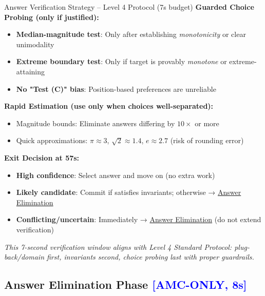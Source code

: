 \documentclass{article}
\begin{document}
\begin{classifybox}{Answer Verification Strategy -- Level 4 Protocol (7s budget)}
\textbf{Guarded Choice Probing (only if justified):}
\begin{itemize}[nosep]
\item \textbf{Median-magnitude test}: Only after establishing \emph{monotonicity} or clear unimodality
\item \textbf{Extreme boundary test}: Only if target is provably \emph{monotone} or extreme-attaining
\item \textbf{No "Test (C)" bias}: Position-based preferences are unreliable
\end{itemize}

\textbf{Rapid Estimation (use only when choices well-separated):}
\begin{itemize}[nosep]
\item Magnitude bounds: Eliminate answers differing by $10\times$ or more  
\item Quick approximations: $\pi \approx 3$, $\sqrt{2} \approx 1.4$, $e \approx 2.7$ (risk of rounding error)
\end{itemize}


\textbf{Exit Decision at 57s:}
\begin{itemize}[nosep]
\item \textbf{High confidence}: Select answer and move on (no extra work)
\item \textbf{Likely candidate}: Commit if satisfies invariants; otherwise → \hyperlink{answer-eliminate}{Answer Elimination}
\item \textbf{Conflicting/uncertain}: Immediately → \hyperlink{answer-eliminate}{Answer Elimination} (do not extend verification)
\end{itemize}

\textit{This 7-second verification window aligns with Level 4 Standard Protocol: plug-back/domain first, invariants second, choice probing last with proper guardrails.}
\end{classifybox}

\hypertarget{answer-eliminate}{}
\subsection{Answer Elimination Phase {\footnotesize\textcolor{blue}{[AMC-ONLY, 8s]}}}
\label{sec:answer-elimination-phase}
{\footnotesize\textcolor{timegreen}{}}\\
\end{document}
